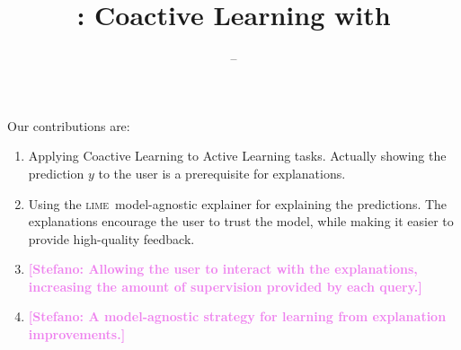 \documentclass[a4paper,12pt]{article}
\title{\mojito: Coactive Learning with \lime}
\author{--}
\newcommand{\stefano}[1]{{\bf \textcolor{violet}{{[Stefano: #1]}}}}
\newcommand{\lime}{\textsc{lime}}
\begin{document}
\maketitle

Our contributions are:
\begin{enumerate}
    \item Applying Coactive Learning to Active Learning tasks. Actually showing
        the prediction $y$ to the user is a prerequisite for explanations.
    \item Using the \lime\ model-agnostic explainer for explaining the predictions.
        The explanations encourage the user to trust the model, while making it easier
        to provide high-quality feedback.
    \item \stefano{Allowing the user to interact with the explanations,
        increasing the amount of supervision provided by each query.}
    \item \stefano{A model-agnostic strategy for learning from explanation
        improvements.}
\end{enumerate}
\end{document}
